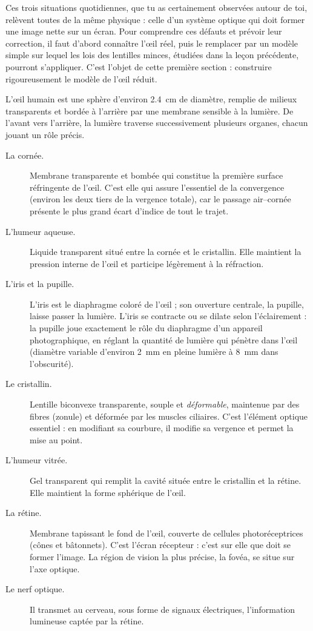 \documentclass[11pt]{article}
\newcommand{\cle}[1]{{\popxbold\color{popdark}#1}}
\newcounter{popsec}
\newcounter{popsub}
\newcommand{\courssub}[1]{%
  \stepcounter{popsub}%
  \par\vspace{9pt}\noindent{\popxbold\fontsize{11.5}{13}\selectfont\color{popink}{\color{poporange}\thepopsec.\thepopsub}\hspace{6pt}#1}\par\nopagebreak\vspace{4pt}
}
\begin{document}
Ces trois situations quotidiennes, que tu as certainement observées autour de toi, relèvent toutes de la même physique : celle d'un système optique qui doit former une image nette sur un écran. Pour comprendre ces défauts et prévoir leur correction, il faut d'abord connaître l'œil réel, puis le remplacer par un modèle simple sur lequel les lois des lentilles minces, étudiées dans la leçon précédente, pourront s'appliquer. C'est l'objet de cette première section : construire rigoureusement le modèle de \cle{l'œil réduit}.

\courssub{Description sommaire de l'œil réel}

L'œil humain est une sphère d'environ \SI{2,4}{cm} de diamètre, remplie de milieux transparents et bordée à l'arrière par une membrane sensible à la lumière. De l'avant vers l'arrière, la lumière traverse successivement plusieurs organes, chacun jouant un rôle précis.

\begin{description}
\item[La cornée.] Membrane transparente et bombée qui constitue la première surface réfringente de l'œil. C'est elle qui assure l'essentiel de la convergence (environ les deux tiers de la vergence totale), car le passage air--cornée présente le plus grand écart d'indice de tout le trajet.
\item[L'humeur aqueuse.] Liquide transparent situé entre la cornée et le cristallin. Elle maintient la pression interne de l'œil et participe légèrement à la réfraction.
\item[L'iris et la pupille.] L'iris est le diaphragme coloré de l'œil ; son ouverture centrale, la \cle{pupille}, laisse passer la lumière. L'iris se contracte ou se dilate selon l'éclairement : la pupille joue exactement le rôle du diaphragme d'un appareil photographique, en réglant la quantité de lumière qui pénètre dans l'œil (diamètre variable d'environ \SI{2}{mm} en pleine lumière à \SI{8}{mm} dans l'obscurité).
\item[Le cristallin.] Lentille biconvexe transparente, souple et \emph{déformable}, maintenue par des fibres (zonule) et déformée par les muscles ciliaires. C'est l'élément optique essentiel : en modifiant sa courbure, il modifie sa vergence et permet la mise au point.
\item[L'humeur vitrée.] Gel transparent qui remplit la cavité située entre le cristallin et la rétine. Elle maintient la forme sphérique de l'œil.
\item[La rétine.] Membrane tapissant le fond de l'œil, couverte de cellules photoréceptrices (cônes et bâtonnets). C'est \cle{l'écran récepteur} : c'est sur elle que doit se former l'image. La région de vision la plus précise, la fovéa, se situe sur l'axe optique.
\item[Le nerf optique.] Il transmet au cerveau, sous forme de signaux électriques, l'information lumineuse captée par la rétine.
\end{description}
\end{document}
